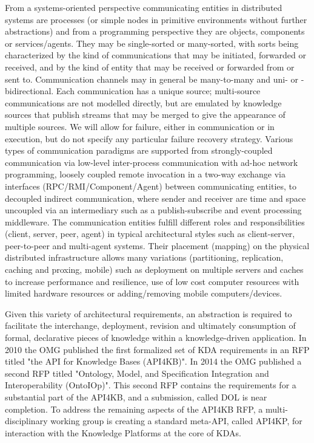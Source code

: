 \documentclass[runningheads]{llncs}
\begin{document}
From a systems-oriented perspective communicating entities in distributed systems are processes (or simple nodes in primitive environments without further abstractions) and from a programming perspective they are objects, components or services/agents. They may be single-sorted or many-sorted, with sorts being characterized by the kind of communications that may be initiated, forwarded or received, and by the kind of entity that may be received or forwarded from or sent to.
Communication channels may in general be many-to-many and uni- or -bidirectional. Each communication has a unique source; multi-source communications are not modelled directly, but are emulated by knowledge sources that publish streams that may be merged to give the appearance of multiple sources. We will allow for failure, either in communication or in execution, but do not specify any particular failure recovery strategy. 
Various types of communication paradigms are supported from strongly-coupled communication via low-level inter-process communication with ad-hoc network programming, loosely coupled remote invocation in a two-way exchange via interfaces  (RPC/RMI/Component/Agent) between communicating entities, to decoupled indirect communication, where sender and receiver are time and space uncoupled via an intermediary such as a publish-subscribe and event processing middleware.
The communication entities fulfill different roles and responsibilities (client, server, peer, agent) in typical architectural styles such as client-server, peer-to-peer and multi-agent systems. Their placement (mapping) on the physical distributed infrastructure allows many variations (partitioning, replication, caching and proxing, mobile) such as deployment on multiple servers and caches to increase performance and resilience, use of low cost computer resources with limited hardware resources or adding/removing mobile computers/devices.

Given this variety of architectural requirements, an abstraction is required to facilitate the interchange, deployment, revision and ultimately consumption of formal, declarative pieces of knowledge within a knowledge-driven application. In 2010 the OMG published the first formalized set of KDA requirements in an RFP titled "the API for Knowledge Bases (API4KB)". In 2014 the OMG published a second RFP titled "Ontology, Model, and Specification Integration and Interoperability (OntoIOp)"\cite{OntoIOp}. This second RFP contains the requirements for a substantial part of the API4KB, and a submission, called DOL\cite{DOL} is near completion. To address the remaining aspects of the API4KB RFP, a multi-disciplinary working group is creating a standard meta-API, called API4KP, for interaction with the Knowledge Platforms at the core of KDAs. 
\end{document}
